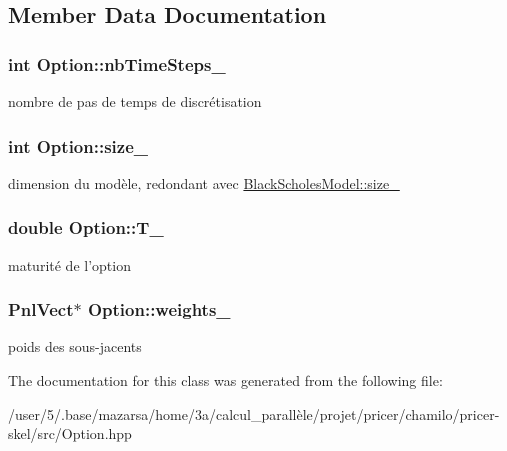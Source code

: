 \subsection{Member Data Documentation}
\hypertarget{classOption_ad424223ea2698144e823c494d625fbe0}{
\subsubsection[{nb\-Time\-Steps\-\_\-}]{\setlength{\rightskip}{0pt plus 5cm}int Option\-::nb\-Time\-Steps\-\_\-}}\label{classOption_ad424223ea2698144e823c494d625fbe0}
nombre de pas de temps de discrétisation \hypertarget{classOption_a65fae5103b50f953f29a86b1a17b4540}{
\subsubsection[{size\-\_\-}]{\setlength{\rightskip}{0pt plus 5cm}int Option\-::size\-\_\-}}\label{classOption_a65fae5103b50f953f29a86b1a17b4540}
dimension du modèle, redondant avec \hyperlink{classBlackScholesModel_ab84e9318c0c1e8a50d5e2f9a70f1256e}{Black\-Scholes\-Model\-::size\-\_\-} \hypertarget{classOption_a89f0365b68626cc5eb523f12159e0764}{
\subsubsection[{T\-\_\-}]{\setlength{\rightskip}{0pt plus 5cm}double Option\-::\-T\-\_\-}}\label{classOption_a89f0365b68626cc5eb523f12159e0764}
maturité de l'option \hypertarget{classOption_a8f5978de54bbccdc3af36f30eaae1fdb}{
\subsubsection[{weights\-\_\-}]{\setlength{\rightskip}{0pt plus 5cm}Pnl\-Vect$\ast$ Option\-::weights\-\_\-}}\label{classOption_a8f5978de54bbccdc3af36f30eaae1fdb}
poids des sous-\/jacents 

The documentation for this class was generated from the following file\-:\begin{DoxyCompactItemize}
\item 
/user/5/.\-base/mazarsa/home/3a/calcul\-\_\-parallèle/projet/pricer/chamilo/pricer-\/skel/src/Option.\-hpp\end{DoxyCompactItemize}
